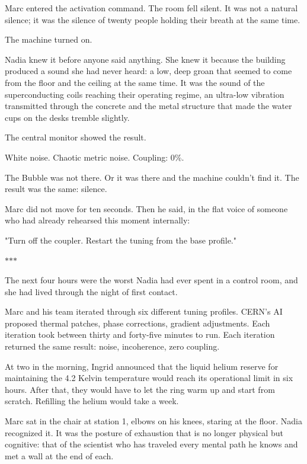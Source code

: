 \documentclass[11pt,a5paper,twoside]{book}
\begin{document}
Marc entered the activation command. The room fell silent. It was not a natural silence; it was the silence of twenty people holding their breath at the same time.

The machine turned on.

Nadia knew it before anyone said anything. She knew it because the building produced a sound she had never heard: a low, deep groan that seemed to come from the floor and the ceiling at the same time. It was the sound of the superconducting coils reaching their operating regime, an ultra-low vibration transmitted through the concrete and the metal structure that made the water cups on the desks tremble slightly.

The central monitor showed the result.

White noise. Chaotic metric noise. Coupling: 0\%.

The Bubble was not there. Or it was there and the machine couldn't find it. The result was the same: silence.

Marc did not move for ten seconds. Then he said, in the flat voice of someone who had already rehearsed this moment internally:

"Turn off the coupler. Restart the tuning from the base profile."

\vspace{1.5em}
\begin{center}$\ast$\quad$\ast$\quad$\ast$\end{center}
\vspace{1.5em}

The next four hours were the worst Nadia had ever spent in a control room, and she had lived through the night of first contact.

Marc and his team iterated through six different tuning profiles. CERN's AI proposed thermal patches, phase corrections, gradient adjustments. Each iteration took between thirty and forty-five minutes to run. Each iteration returned the same result: noise, incoherence, zero coupling.

At two in the morning, Ingrid announced that the liquid helium reserve for maintaining the 4.2 Kelvin temperature would reach its operational limit in six hours. After that, they would have to let the ring warm up and start from scratch. Refilling the helium would take a week.

Marc sat in the chair at station 1, elbows on his knees, staring at the floor. Nadia recognized it. It was the posture of exhaustion that is no longer physical but cognitive: that of the scientist who has traveled every mental path he knows and met a wall at the end of each.
\end{document}

